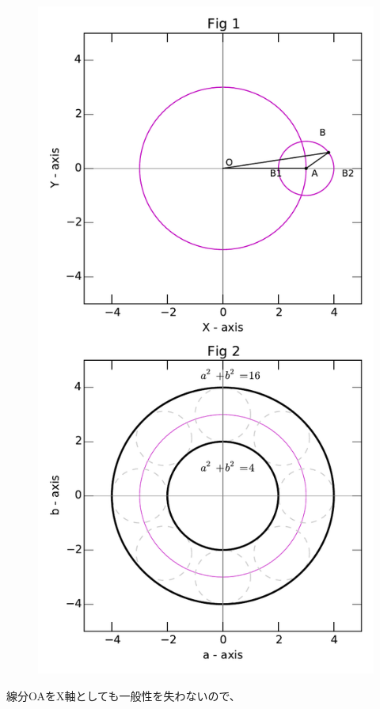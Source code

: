 \documentclass[a4j,10pt,oneside,openany]{jsbook}
\begin{document}
\begin{figure}
	\vspace*{-\intextsep}
	\includegraphics[width=25zw]{fig1.pdf}
	\label{fig}
\end{figure}
線分OAを$\mathrm{X}$軸としても一般性を失わないので、
\end{document}
